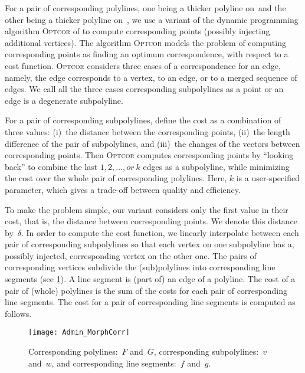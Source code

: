 For a pair of corresponding polylines, 
one being a thicker polyline on~\ml and 
the other being a thicker polyline on~\ms, 
we use a variant of 
the dynamic programming algorithm \textsc{Optcor} 
of \textcite{Noellenburg2008} 
to compute corresponding points 
(possibly injecting additional
vertices).
The algorithm \textsc{Optcor} models the problem of 
computing corresponding points as 
finding an optimum correspondence, 
with respect to a cost function.
\textsc{Optcor} considers three cases of a 
correspondence for an edge, namely, 
the edge corresponds to a vertex, 
to an edge, or to a merged sequence of edges.
We call all the three cases corresponding subpolylines
as a point or an edge is a degenerate subpolyline. 

For a pair of corresponding subpolylines, 
\textcite{Noellenburg2008} define the cost 
as a combination of three values: 
(i)~the distance between the corresponding points, 
(ii)~the length difference of the pair of subpolylines, and 
(iii)~the changes of the vectors between corresponding points. 
Then \textsc{Optcor} computes corresponding points 
by ``looking back'' to combine 
the last $1,2,\ldots, or~k$ edges as a subpolyline, 
while minimizing the cost over 
the whole pair of corresponding polylines. 
Here, $k$ is a user-specified parameter, 
which gives a trade-off between quality and efficiency.

To make the problem simple, 
our variant considers only the first value in their cost, 
that is, the distance between corresponding points. 
We denote this distance by~$\delta$.  
In order to compute the cost function, we linearly
interpolate between each pair of corresponding subpolylines 
so that each vertex on one subpolyline has a, possibly injected, 
corresponding vertex on the other one.
The pairs of corresponding vertices
subdivide the (sub)polylines into corresponding line segments
(see \fig\ref{fig:Admin_BasicConcepts}).  
A line segment is (part of) an edge of a polyline. 
The cost of a pair of (whole) polylines is 
the sum of the costs for each pair of 
corresponding line segments. 
The cost for a pair of corresponding line segments 
is computed as follows.

\begin{figure}[tb]
\centering
\texttt{[image: Admin\_MorphCorr]}
\caption{Corresponding polylines:~$F$ and~$G$,
	corresponding subpolylines:~$v$ and~$w$,
	and corresponding line segments:~$f$ and~$g$.}
\label{fig:Admin_BasicConcepts}
\end{figure}

